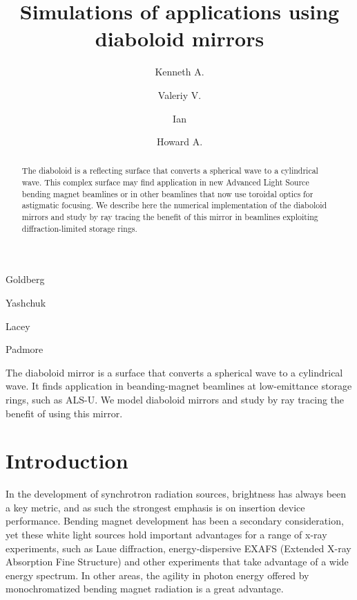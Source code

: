 \documentclass{iucr}       %
\begin{document}




\title{Simulations of applications using diaboloid mirrors}

\author[a]{Kenneth A.}{Goldberg}
\author[a]{Valeriy V.}{Yashchuk}
\author[a]{Ian}{Lacey}
\author[a]{Howard A.}{Padmore}




\begin{synopsis}
The diaboloid mirror is a surface that converts a spherical wave to a cylindrical wave. It finds application in beanding-magnet beamlines at low-emittance storage rings, such as ALS-U. We model diaboloid mirrors and study by ray tracing the benefit of using this mirror.
\end{synopsis}

\begin{abstract}
The diaboloid is a reflecting surface that converts a spherical wave to a cylindrical wave. This complex surface may find application in new Advanced Light Source bending magnet beamlines or in other beamlines that now use toroidal optics for astigmatic focusing. We describe here the numerical implementation of the diaboloid mirrors and study by ray tracing the benefit of this mirror in beamlines exploiting diffraction-limited storage rings.
\end{abstract}

\section{Introduction}

In the development of synchrotron radiation sources, brightness has always been a key metric, and as such the strongest emphasis is on insertion device performance. Bending magnet development has been a secondary consideration, yet these white light sources hold important advantages for a range of x-ray experiments, such as Laue diffraction, energy-dispersive EXAFS (Extended X-ray Absorption Fine Structure) and other experiments that take advantage of a wide energy spectrum. In other areas, the agility in photon energy offered by monochromatized bending magnet radiation is a great advantage. 
\end{document}

